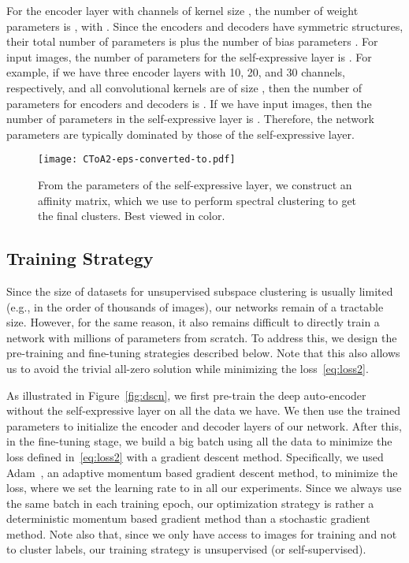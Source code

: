 \documentclass{article}
\begin{document}
For the  encoder layer with  channels of kernel size , the number of weight parameters is , with . 
Since the encoders and decoders have symmetric structures, their total number of  parameters is  plus the number of bias parameters . For  input images, the number of parameters for the self-expressive layer is . For example, if we have three encoder layers with 10, 20, and 30 channels, respectively, and all convolutional kernels are of size , then the number of parameters for encoders and decoders is . If we have  input images, then the number of parameters in the self-expressive layer is . Therefore, the network parameters are typically dominated by those of the self-expressive layer.

\begin{figure}[!t]
\centering
\texttt{[image: CToA2-eps-converted-to.pdf]}
\caption{From the parameters of the self-expressive layer, we construct an affinity matrix, which we use to perform spectral clustering to get the final clusters. Best viewed in color.}\label{fig:CToA}
\vspace{-0.4cm}
\end{figure}

\subsection{Training Strategy}

Since the size of datasets for unsupervised subspace clustering is usually limited (e.g., in the order of thousands of images), our networks remain of a tractable size. However, for the same reason, it also remains difficult to directly train a network with millions of parameters from scratch. To address this, we design the pre-training and fine-tuning strategies described below. Note that this also allows us to avoid the trivial all-zero solution while minimizing the loss~\eqref{eq:loss2}. 

As illustrated in Figure~\ref{fig:dscn}, we first pre-train the deep auto-encoder without the self-expressive layer on all the data we have. We then use the trained parameters to initialize the encoder and decoder layers of our network. After this, in the fine-tuning stage, we build a big batch using all the data to minimize the loss  defined in~\eqref{eq:loss2} with a gradient descent method. Specifically, we used Adam~\cite{kingma2014adam}, an adaptive momentum based gradient descent method, to minimize the loss, where we set the learning rate to  in all our experiments. Since we always use the same batch in each training epoch, our optimization strategy is rather a deterministic momentum based gradient method than a stochastic gradient method. 
Note also that, since we only have access to images for training and not to cluster labels, our training strategy is unsupervised (or self-supervised).
\end{document}
